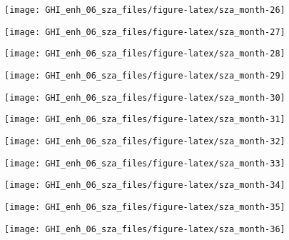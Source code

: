 \documentclass[
  10pt,
  a4paper,oneside]{article}
\begin{document}
\begin{center}\texttt{[image: GHI\_enh\_06\_sza\_files/figure-latex/sza\_month-26]} \end{center}

\begin{center}\texttt{[image: GHI\_enh\_06\_sza\_files/figure-latex/sza\_month-27]} \end{center}

\begin{center}\texttt{[image: GHI\_enh\_06\_sza\_files/figure-latex/sza\_month-28]} \end{center}

\begin{center}\texttt{[image: GHI\_enh\_06\_sza\_files/figure-latex/sza\_month-29]} \end{center}

\begin{center}\texttt{[image: GHI\_enh\_06\_sza\_files/figure-latex/sza\_month-30]} \end{center}

\begin{center}\texttt{[image: GHI\_enh\_06\_sza\_files/figure-latex/sza\_month-31]} \end{center}

\begin{center}\texttt{[image: GHI\_enh\_06\_sza\_files/figure-latex/sza\_month-32]} \end{center}

\begin{center}\texttt{[image: GHI\_enh\_06\_sza\_files/figure-latex/sza\_month-33]} \end{center}

\begin{center}\texttt{[image: GHI\_enh\_06\_sza\_files/figure-latex/sza\_month-34]} \end{center}

\begin{center}\texttt{[image: GHI\_enh\_06\_sza\_files/figure-latex/sza\_month-35]} \end{center}

\begin{center}\texttt{[image: GHI\_enh\_06\_sza\_files/figure-latex/sza\_month-36]} \end{center}

\newpage
\FloatBarrier
\end{document}
